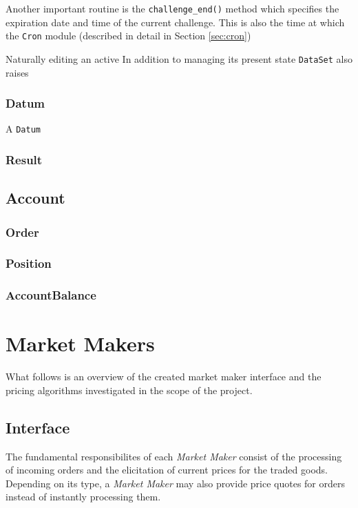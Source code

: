 \documentclass[bsc,frontabs,twoside,singlespacing,parskip,deptreport]{infthesis}     %
\begin{document}
\begin{itemize}
	Another important routine is the {\tt challenge\_end()} method which specifies the expiration date and time of the current challenge. This is also the time at which the {\tt Cron} module (described in detail in Section \ref{sec:cron})

	Naturally editing an active 
	In addition to managing its present state {\tt DataSet} also raises 
    
\subsubsection{Datum}

	A {\tt Datum} 

\subsubsection{Result}


\subsection{Account}

\subsubsection{Order}

\subsubsection{Position}

\subsubsection{AccountBalance}


\section{Market Makers}
    What follows is an overview of the created market maker interface and the pricing algorithms investigated in the scope of the project.

\subsection{Interface}

The fundamental responsibilites of each {\em Market Maker} consist of the processing of incoming orders and the elicitation of current prices for the traded goods. Depending on its type, a {\em Market Maker} may also provide price quotes for orders instead of instantly processing them. 


\end{itemize}
\end{document}
